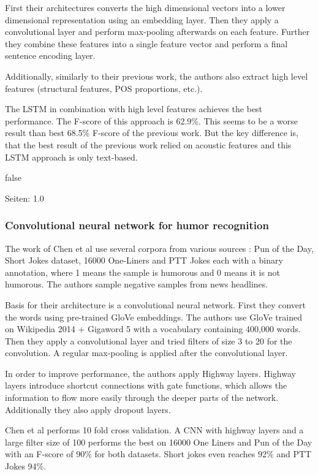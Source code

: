 \documentclass[draft,final,oneside]{vutinfth} %
\begin{document}
First their architectures converts the high dimensional vectors into a lower dimensional representation using an embedding layer. Then they apply a convolutional layer and perform max-pooling afterwards on each feature. Further they combine these features into a single feature vector and perform a final sentence encoding layer. 

Additionally, similarly to their previous work, the authors also extract high level features (structural features, POS proportions, etc.).

The LSTM in combination with high level features achieves the best performance. The F-score of this approach is 62.9\%. This seems to be a worse result than best 68.5\% F-score of the previous work. But the key difference is, that the best result of the previous work relied on acoustic features and this LSTM approach is only text-based.

\if false
\cite{bertero2016long}

Seiten: 1.0
\fi

\subsubsection{Convolutional neural network for humor recognition}

The work of Chen et al use several corpora from various sources \cite{chen2017convolutional}: Pun of the Day, Short Jokes dataset, 16000 One-Liners and PTT Jokes each with a binary annotation, where 1 means the sample is humorous and 0 means it is not humorous. The authors sample negative samples from news headlines.

Basis for their architecture is a convolutional neural network. First they convert the words using pre-trained GloVe embeddings. The authors use GloVe trained on Wikipedia 2014 + Gigaword 5 with a vocabulary containing 400,000 words. Then they apply a convolutional layer and tried filters of size 3 to 20 for the convolution. A regular max-pooling is applied after the convolutional layer.

In order to improve performance, the authors apply Highway layers. Highway layers introduce shortcut connections with gate functions, which allows the information to flow more easily through the deeper parts of the network. Additionally they also apply dropout layers.

Chen et al performs 10 fold cross validation. A CNN with highway layers and a large filter size of 100 performs the best on 16000 One Liners and Pun of the Day with an F-score of 90\% for both datasets. Short jokes even reaches 92\% and PTT Jokes 94\%. 
\end{document}
